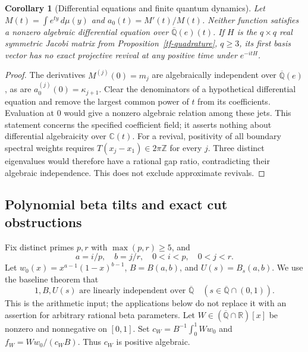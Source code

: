 \documentclass[11pt,a4paper]{article}
\newtheorem{corollary}[theorem]{Corollary}
\theoremstyle{definition}
\theoremstyle{remark}
\numberwithin{equation}{section}
\newcommand{\Qbar}{\overline{\mathbb Q}}
\begin{document}
\begin{corollary}[Differential equations and finite quantum dynamics]
\label{tf-dynamics}
Let $M(t)=\int e^{ty}\,d\mu(y)$ and $a_0(t)=M'(t)/M(t)$.
Neither function satisfies a nonzero algebraic differential equation
over $\Qbar(e)(t)$.  If $H$ is the $q\times q$ real symmetric Jacobi
matrix from Proposition~\ref{tf-quadrature}, $q\ge3$, its first basis
vector has no exact projective revival at any positive time under
$e^{-itH}$.
\end{corollary}
\begin{proof}
The derivatives $M^{(j)}(0)=m_j$ are algebraically independent over
$\Qbar(e)$, as are $a_0^{(j)}(0)=\kappa_{j+1}$.
Clear the denominators of a hypothetical differential equation and
remove the largest common power of $t$ from its coefficients.
Evaluation at $0$ would give a nonzero algebraic relation among these
jets.  This statement concerns the specified coefficient field;
it asserts nothing about differential algebraicity over $\mathbb C(t)$.
For a revival, positivity of all boundary spectral weights requires
$T(x_j-x_1)\in2\pi\mathbb Z$ for every $j$.  Three distinct eigenvalues
would therefore have a rational gap ratio, contradicting their
algebraic independence.  This does not exclude approximate revivals.
\end{proof}

\subsection{Polynomial beta tilts and exact cut obstructions}
\label{tf-beta-section}

Fix distinct primes $p,r$ with $\max(p,r)\ge5$, and
\begin{equation}\label{tf-beta-parameters}
 a=i/p,\quad b=j/r,\quad 0<i<p,\quad0<j<r.
\end{equation}
Let $w_0(x)=x^{a-1}(1-x)^{b-1}$, $B=B(a,b)$, and
$U(s)=B_s(a,b)$.  We use the baseline theorem that
\begin{equation}\label{tf-beta-input}
 1,B,U(s)\text{ are linearly independent over }\Qbar
       \quad(s\in\Qbar\cap(0,1)).
\end{equation}
This is the arithmetic input; the applications below do not replace it
with an assertion for arbitrary rational beta parameters.
Let $W\in(\Qbar\cap\mathbb R)[x]$ be nonzero and nonnegative on $[0,1]$.
Set $c_W=B^{-1}\int_0^1Ww_0$ and
$f_W=Ww_0/(c_WB)$.  Thus $c_W$ is positive algebraic.
\end{document}

